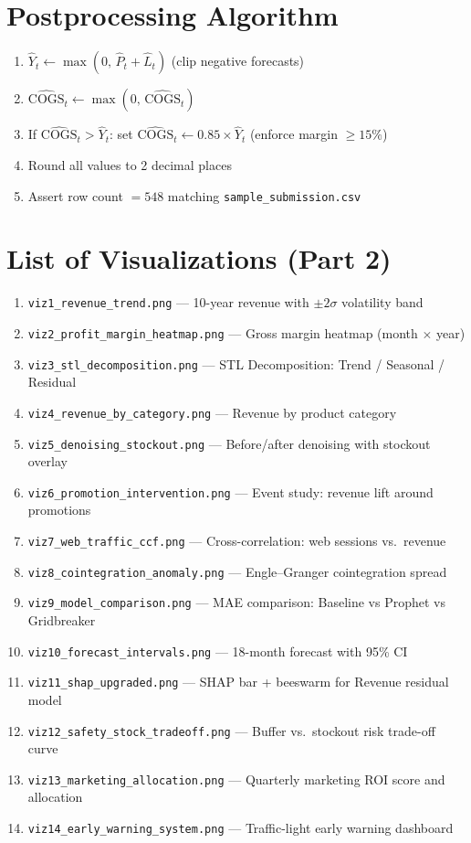\documentclass{article}
\begin{document}
\section{Postprocessing Algorithm}

\begin{enumerate}
  \item $\hat{Y}_t \leftarrow \max(0,\, \hat{P}_t + \hat{L}_t)$ \hfill (clip negative forecasts)
  \item $\widehat{\text{COGS}}_t \leftarrow \max(0,\, \widehat{\text{COGS}}_t)$
  \item If $\widehat{\text{COGS}}_t > \hat{Y}_t$: set $\widehat{\text{COGS}}_t \leftarrow 0.85 \times \hat{Y}_t$ \hfill (enforce margin $\geq 15\%$)
  \item Round all values to 2 decimal places
  \item Assert row count $= 548$ matching \texttt{sample\_submission.csv}
\end{enumerate}

\section{List of Visualizations (Part 2)}

\begin{enumerate}
  \item \texttt{viz1\_revenue\_trend.png} --- 10-year revenue with $\pm2\sigma$ volatility band
  \item \texttt{viz2\_profit\_margin\_heatmap.png} --- Gross margin heatmap (month $\times$ year)
  \item \texttt{viz3\_stl\_decomposition.png} --- STL Decomposition: Trend / Seasonal / Residual
  \item \texttt{viz4\_revenue\_by\_category.png} --- Revenue by product category
  \item \texttt{viz5\_denoising\_stockout.png} --- Before/after denoising with stockout overlay
  \item \texttt{viz6\_promotion\_intervention.png} --- Event study: revenue lift around promotions
  \item \texttt{viz7\_web\_traffic\_ccf.png} --- Cross-correlation: web sessions vs.~revenue
  \item \texttt{viz8\_cointegration\_anomaly.png} --- Engle--Granger cointegration spread
  \item \texttt{viz9\_model\_comparison.png} --- MAE comparison: Baseline vs Prophet vs Gridbreaker
  \item \texttt{viz10\_forecast\_intervals.png} --- 18-month forecast with 95\% CI
  \item \texttt{viz11\_shap\_upgraded.png} --- SHAP bar + beeswarm for Revenue residual model
  \item \texttt{viz12\_safety\_stock\_tradeoff.png} --- Buffer vs.~stockout risk trade-off curve
  \item \texttt{viz13\_marketing\_allocation.png} --- Quarterly marketing ROI score and allocation
  \item \texttt{viz14\_early\_warning\_system.png} --- Traffic-light early warning dashboard
\end{enumerate}
\end{document}
